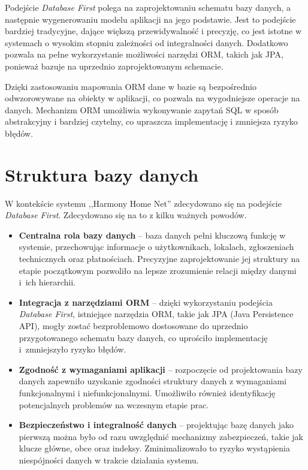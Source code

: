 Podejście \emph{Database First} polega na zaprojektowaniu schematu bazy danych, a następnie wygenerowaniu modelu aplikacji na jego podstawie. Jest to podejście bardziej tradycyjne, dające większą przewidywalność i precyzję, co jest istotne w systemach o wysokim stopniu zależności od integralności danych. Dodatkowo pozwala na pełne wykorzystanie możliwości narzędzi ORM, takich jak JPA, ponieważ bazuje na uprzednio zaprojektowanym schemacie. 

Dzięki zastosowaniu mapowania ORM dane w bazie są bezpośrednio odwzorowywane na obiekty w aplikacji, co pozwala na wygodniejsze operacje na danych. Mechanizm ORM umożliwia wykonywanie zapytań SQL w sposób abstrakcyjny i bardziej czytelny, co upraszcza implementację i zmniejsza ryzyko błędów.

\section{Struktura bazy danych}
W kontekście systemu ,,Harmony Home Net'' zdecydowano się na podejście \emph{Database First}. Zdecydowano się na to z kilku ważnych powodów.
\begin{itemize}
    \item \textbf{Centralna rola bazy danych} -- baza danych pełni kluczową funkcję w systemie, przechowując informacje o użytkownikach, lokalach, zgłoszeniach technicznych oraz płatnościach. Precyzyjne zaprojektowanie jej struktury na etapie początkowym pozwoliło na lepsze zrozumienie relacji między danymi i~ich hierarchii.
    \item \textbf{Integracja z narzędziami ORM} -- dzięki wykorzystaniu podejścia \emph{Database First}, istniejące narzędzia ORM, takie jak JPA (Java Persistence API), mogły zostać bezproblemowo dostosowane do uprzednio przygotowanego schematu bazy danych, co uprościło implementację i~zmniejszyło ryzyko błędów.
    \item \textbf{Zgodność z wymaganiami aplikacji} -- rozpoczęcie od projektowania bazy danych zapewniło uzyskanie zgodności struktury danych z wymaganiami funkcjonalnymi i niefunkcjonalnymi. Umożliwiło również identyfikację potencjalnych problemów na wczesnym etapie prac.
    \item \textbf{Bezpieczeństwo i integralność danych} -- projektując bazę danych jako pierwszą można było od razu uwzględnić mechanizmy zabezpieczeń, takie jak klucze główne, obce oraz indeksy. Zminimalizowało to ryzyko wystąpienia niespójności danych w trakcie działania systemu.
\end{itemize}

